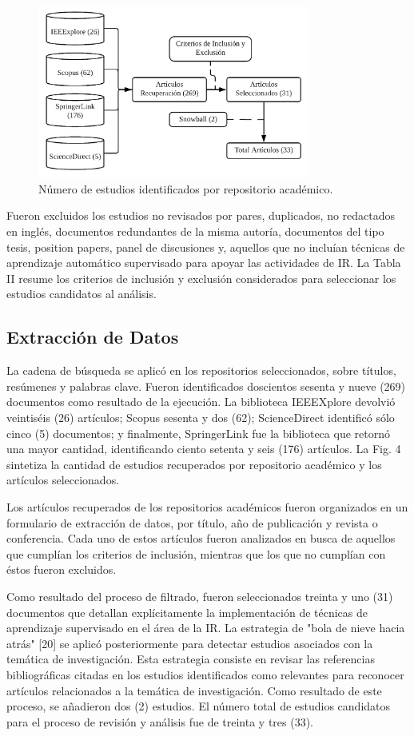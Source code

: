 \documentclass[journal]{IEEEtran}
\begin{document}
\begin{figure}[!t]
\centering
\includegraphics[width=3.5in]{figures/figure4_Guada.png}
\caption{Número de estudios identificados por repositorio académico.}
\label{fig4}
\end{figure}

Fueron excluidos los estudios no revisados por pares, duplicados, no redactados en inglés, documentos redundantes de la misma autoría, documentos del tipo tesis, position papers, panel de discusiones y, aquellos que no incluían técnicas de aprendizaje automático supervisado para apoyar las actividades de IR. La Tabla II resume los criterios de inclusión y exclusión considerados para seleccionar los estudios candidatos al análisis.

\subsection{Extracción de Datos}

La cadena de búsqueda se aplicó en los repositorios seleccionados, sobre títulos, resúmenes y palabras clave. Fueron identificados doscientos sesenta y nueve (269) documentos como resultado de la ejecución. La biblioteca IEEEXplore devolvió veintiséis (26) artículos; Scopus sesenta y dos (62); ScienceDirect identificó sólo cinco (5) documentos; y finalmente, SpringerLink fue la biblioteca que retornó una mayor cantidad, identificando ciento setenta y seis (176) artículos. La Fig. 4 sintetiza la cantidad de estudios recuperados por repositorio académico y los artículos seleccionados.

Los artículos recuperados de los repositorios académicos fueron organizados en un formulario de extracción de datos, por título, año de publicación y revista o conferencia. Cada uno de estos artículos fueron analizados en busca de aquellos que cumplían los criterios de inclusión, mientras que los que no cumplían con éstos fueron excluidos. 

Como resultado del proceso de filtrado, fueron seleccionados treinta y uno (31) documentos que detallan explícitamente la implementación de técnicas de aprendizaje supervisado en el área de la IR. La estrategia de "bola de nieve hacia atrás" \cite{wohlin2014guidelines}[20] se aplicó posteriormente para detectar estudios asociados con la temática de investigación. Esta estrategia consiste en revisar las referencias bibliográficas citadas en los estudios identificados como relevantes para reconocer artículos relacionados a la temática de investigación. Como resultado de este proceso, se añadieron dos (2) estudios. El número total de estudios candidatos para el proceso de revisión y análisis fue de treinta y tres (33).
\end{document}

